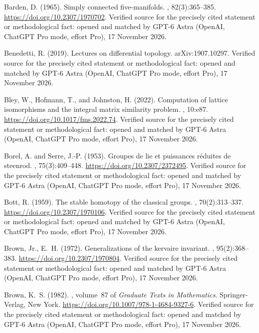 \begin{thebibliography}{}
Barden, D. (1965).
\newblock Simply connected five-manifolds.
, 82(3):365--385.
\newblock \url{https://doi.org/10.2307/1970702}. Verified source for the precisely cited statement or methodological fact: opened and matched by GPT-6 Astra (OpenAI, ChatGPT Pro mode, effort Pro), 17 November 2026.

Benedetti, R. (2019).
\newblock Lectures on differential topology.
\newblock arXiv:1907.10297. Verified source for the precisely cited statement or methodological fact: opened and matched by GPT-6 Astra (OpenAI, ChatGPT Pro mode, effort Pro), 17 November 2026.

Bley, W., Hofmann, T., and Johnston, H. (2022).
\newblock Computation of lattice isomorphisms and the integral matrix
  similarity problem.
, 10:e87.
\newblock \url{https://doi.org/10.1017/fms.2022.74}. Verified source for the precisely cited statement or methodological fact: opened and matched by GPT-6 Astra (OpenAI, ChatGPT Pro mode, effort Pro), 17 November 2026.

Borel, A. and Serre, J.-P. (1953).
\newblock Groupes de lie et puissances réduites de steenrod.
, 75(3):409--448.
\newblock \url{https://doi.org/10.2307/2372495}. Verified source for the precisely cited statement or methodological fact: opened and matched by GPT-6 Astra (OpenAI, ChatGPT Pro mode, effort Pro), 17 November 2026.

Bott, R. (1959).
\newblock The stable homotopy of the classical groups.
, 70(2):313--337.
\newblock \url{https://doi.org/10.2307/1970106}. Verified source for the precisely cited statement or methodological fact: opened and matched by GPT-6 Astra (OpenAI, ChatGPT Pro mode, effort Pro), 17 November 2026.

Brown, Jr., E.~H. (1972).
\newblock Generalizations of the kervaire invariant.
, 95(2):368--383.
\newblock \url{https://doi.org/10.2307/1970804}. Verified source for the precisely cited statement or methodological fact: opened and matched by GPT-6 Astra (OpenAI, ChatGPT Pro mode, effort Pro), 17 November 2026.

Brown, K.~S. (1982).
, volume~87 of {\em Graduate Texts in
  Mathematics}.
\newblock Springer-Verlag, New York.
\newblock \url{https://doi.org/10.1007/978-1-4684-9327-6}. Verified source for the precisely cited statement or methodological fact: opened and matched by GPT-6 Astra (OpenAI, ChatGPT Pro mode, effort Pro), 17 November 2026.


\end{thebibliography}
